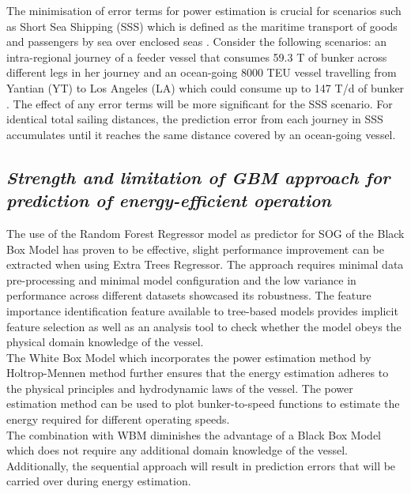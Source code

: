 The minimisation of error terms for power estimation is crucial for scenarios such as Short Sea Shipping (SSS) which is defined as the maritime transport of goods and passengers by sea over enclosed seas . Consider the following scenarios: an intra-regional journey of a feeder vessel that consumes 59.3 T of bunker across different legs in her journey  and an ocean-going 8000 TEU vessel travelling from Yantian (YT) to Los Angeles (LA) which could consume up to 147 T/d of bunker . The effect of any error terms will be more significant for the SSS scenario. For identical total sailing distances, the prediction error from each journey in SSS accumulates until it reaches the same distance covered by an ocean-going vessel.\\

\subsection*{\emph{Strength and limitation of GBM approach for prediction of energy-efficient operation}}

The use of the Random Forest Regressor model as predictor for SOG of the Black Box Model has proven to be effective, slight performance improvement can be extracted when using Extra Trees Regressor. The approach requires minimal data pre-processing and minimal model configuration and the low variance in performance across different datasets showcased its robustness. The feature importance identification feature available to tree-based models provides implicit feature selection as well as an analysis tool to check whether the model obeys the physical domain knowledge of the vessel.\\

The White Box Model which incorporates the power estimation method by Holtrop-Mennen method further ensures that the energy estimation adheres to the physical principles and hydrodynamic laws of the vessel. The power estimation method can be used to plot bunker-to-speed functions to estimate the energy required for different operating speeds.\\

The combination with WBM diminishes the advantage of a Black Box Model which does not require any additional domain knowledge of the vessel. Additionally, the sequential approach will result in prediction errors that will be carried over during energy estimation.\\ 

